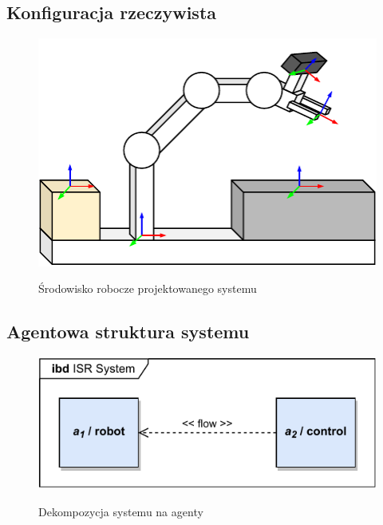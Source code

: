 \subsection{Konfiguracja rzeczywista}
\label{subsec:konfiguracja-urzadzen}

\begin{figure}
    \centering
    \includegraphics[width=\columnwidth]{figures/ISR-system-overview.pdf}
    \label{fig:dekompozycja-agent-1}
    \caption{Środowisko robocze projektowanego systemu}
\end{figure}

\subsection{Agentowa struktura systemu}
\label{subsec:agentowa-struktura}

\begin{figure}
    \centering
    \includegraphics[width=\columnwidth]{figures/ISR-agents.pdf}
    \label{fig:dekompozycja-agent-1}
    \caption{Dekompozycja systemu na agenty}
\end{figure}

